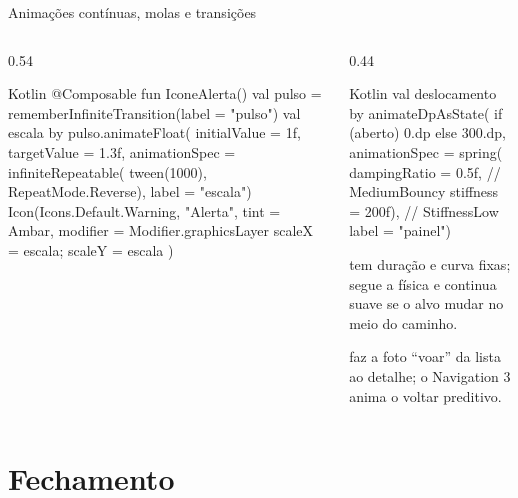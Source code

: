 \documentclass[aspectratio=169,10pt]{beamer}
\begin{document}
\begin{frame}[fragile]{Animações contínuas, molas e transições}
  \begin{columns}[T]
    \begin{column}{0.54\textwidth}
\begin{codigo}[title=Ícone pulsando]{Kotlin}
@Composable
fun IconeAlerta() {
  val pulso = rememberInfiniteTransition(label = "pulso")
  val escala by pulso.animateFloat(
    initialValue = 1f, targetValue = 1.3f,
    animationSpec = infiniteRepeatable(
      tween(1000), RepeatMode.Reverse),
    label = "escala")
  Icon(Icons.Default.Warning, "Alerta", tint = Ambar,
    modifier = Modifier.graphicsLayer {
      scaleX = escala; scaleY = escala
    })
}
\end{codigo}
    \end{column}
    \begin{column}{0.44\textwidth}
\begin{codigo}[title=Painel com mola]{Kotlin}
val deslocamento by animateDpAsState(
  if (aberto) 0.dp else 300.dp,
  animationSpec = spring(
    dampingRatio = 0.5f,   // MediumBouncy
    stiffness = 200f),     // StiffnessLow
  label = "painel")
\end{codigo}
      \begin{conceito}
         tem duração e curva fixas;  segue a física e continua suave se o alvo mudar no meio do caminho.
      \end{conceito}
      \begin{dica}
         faz a foto ``voar'' da lista ao detalhe; o Navigation 3 anima o voltar preditivo.
      \end{dica}
    \end{column}
  \end{columns}
\end{frame}

\section{Fechamento}
\end{document}
